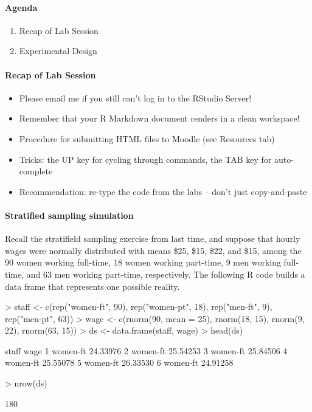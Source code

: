 \documentclass[10pt]{article}
\newcommand{\R}{{\sf R}\xspace}
\begin{document}


\paragraph{Agenda}
\begin{enumerate}
  \itemsep0em
  \item Recap of Lab Session
  \item Experimental Design
\end{enumerate}

\paragraph{Recap of Lab Session}

\begin{itemize}
  \itemsep0em
  \item Please email me if you still can't log in to the RStudio Server!
  \item Remember that your R Markdown document renders in a clean workspace!
  \item Procedure for submitting HTML files to Moodle (see Resources tab)
  \item Tricks: the UP key for cycling through commands, the TAB key for auto-complete
  \item Recommendation: re-type the code from the labs -- don't just copy-and-paste
\end{itemize}


\paragraph{Stratified sampling simulation}

  Recall the stratifield sampling exercise from last time, and suppose that hourly wages were normally distributed with means \$25, \$15, \$22, and \$15, among the 90 women working full-time, 18 women working part-time, 9 men working full-time, and 63 men working part-time, respectively. The following \R code builds a data frame that represents one possible reality. 

\begin{Schunk}
\begin{Sinput}
> staff <- c(rep("women-ft", 90), rep("women-pt", 18), rep("men-ft", 9), rep("men-pt", 63))
> wage <- c(rnorm(90, mean = 25), rnorm(18, 15), rnorm(9, 22), rnorm(63, 15))
> ds <- data.frame(staff, wage)
> head(ds)
\end{Sinput}
\begin{Soutput}
     staff     wage
1 women-ft 24.33976
2 women-ft 25.54253
3 women-ft 25.84506
4 women-ft 25.55078
5 women-ft 26.33530
6 women-ft 24.91258
\end{Soutput}
\begin{Sinput}
> nrow(ds)
\end{Sinput}
\begin{Soutput}
[1] 180
\end{Soutput}
\end{Schunk}
\end{document}
